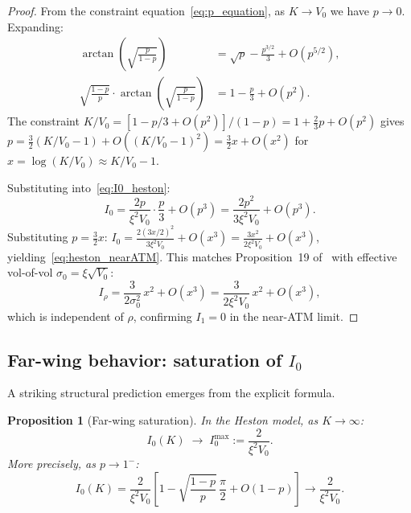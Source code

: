 \documentclass[11pt]{article}
\newtheorem{proposition}[theorem]{Proposition}
\theoremstyle{definition}
\begin{document}
\begin{proof}
From the constraint equation~\eqref{eq:p_equation}, as $K \to V_0$ we have $p \to 0$. Expanding:
\begin{align}
  \arctan\!\left(\sqrt{\frac{p}{1-p}}\right) &= \sqrt{p} - \frac{p^{3/2}}{3} + O(p^{5/2}), \\
  \sqrt{\frac{1-p}{p}} \cdot \arctan\!\left(\sqrt{\frac{p}{1-p}}\right) &= 1 - \frac{p}{3} + O(p^2).
\end{align}
The constraint $K/V_0 = [1-p/3+O(p^2)]/(1-p) = 1 + \tfrac{2}{3}p + O(p^2)$ gives $p = \tfrac{3}{2}(K/V_0-1) + O((K/V_0-1)^2) = \tfrac{3}{2}x + O(x^2)$ for $x = \log(K/V_0) \approx K/V_0 - 1$.

Substituting into~\eqref{eq:I0_heston}:
\begin{equation}
  I_0 = \frac{2p}{\xi^2 V_0}\cdot\frac{p}{3} + O(p^3) = \frac{2p^2}{3\xi^2 V_0} + O(p^3).
\end{equation}
Substituting $p = \tfrac{3}{2}x$:
$I_0 = \frac{2(3x/2)^2}{3\xi^2 V_0} + O(x^3) = \frac{3x^2}{2\xi^2 V_0} + O(x^3)$,
yielding~\eqref{eq:heston_nearATM}. This matches Proposition~19 of~\cite{PWZ2025} with effective vol-of-vol $\sigma_0 = \xi\sqrt{V_0}$:
\begin{equation}
  I_\rho = \frac{3}{2\sigma_0^2}\,x^2 + O(x^3) = \frac{3}{2\xi^2 V_0}\,x^2 + O(x^3),
\end{equation}
which is independent of $\rho$, confirming $I_1 = 0$ in the near-ATM limit.
\end{proof}

\subsection{Far-wing behavior: saturation of $I_0$}\label{sec:far_wing}

A striking structural prediction emerges from the explicit formula.

\begin{proposition}[Far-wing saturation]\label{prop:saturation}
In the Heston model, as $K \to \infty$:
\begin{equation}\label{eq:saturation}
  I_0(K) \;\to\; I_0^{\max} := \frac{2}{\xi^2 V_0}.
\end{equation}
More precisely, as $p \to 1^-$:
\begin{equation}
  I_0(K) = \frac{2}{\xi^2 V_0}\left[1 - \sqrt{\frac{1-p}{p}}\,\frac{\pi}{2} + O(1-p)\right] \to \frac{2}{\xi^2 V_0}.
\end{equation}
\end{proposition}
\end{document}
